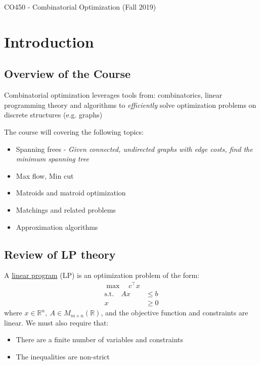 \documentclass[12pt]{article}
\newcommand{\R}{\mathbb{R}}
\theoremstyle{definition}
\theoremstyle{remark}
\numberwithin{equation}{section}
\begin{document}
\begin{center}
    \Large CO450 - Combinatorial Optimization (Fall 2019)
\end{center}

\tableofcontents

\section{Introduction}
\subsection{Overview of the Course}
Combinatorial optimization leverages tools from: combinatorics, linear programming theory and algorithms to \textit{efficiently} solve optimization problems on discrete structures (e.g. graphs)

The course will covering the following topics:
\begin{itemize}
    \item Spanning frees - \textit{Given connected, undirected graphs with edge costs, find the minimum spanning tree}
    \item Max flow, Min cut
    \item Matroids and matroid optimization
    \item Matchings and related problems
    \item Approximation algorithms
\end{itemize}

\subsection{Review of LP theory}
A \underline{linear program} (LP) is an optimization problem of the form:
\begin{equation}\label{eq:intro-review-lp}
\begin{aligned}
    \max \quad c^\intercal x & \\
    \text{s.t.} \quad Ax &\leq b \\
    x &\geq 0
\end{aligned}
\end{equation}
where $x \in \R^n, \ A \in M_{m \times n}(\R) $, and the objective function and constraints are linear. We must also require that:
\begin{itemize}
    \item There are a finite number of variables and constraints
    \item The inequalities are non-strict
\end{itemize}
\end{document}
